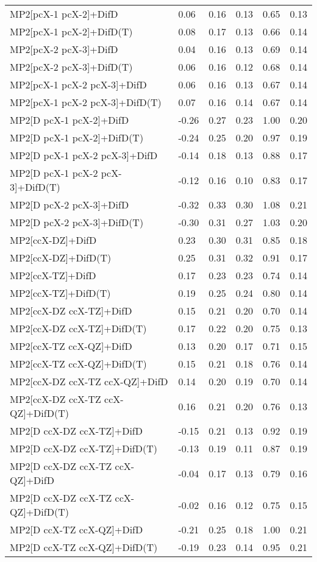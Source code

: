 \begin{table}
\begin{tabular}{l l l l l l }
    MP2[pcX-1 pcX-2]+DifD & 0.06 & 0.16 & 0.13 & 0.65 & 0.13 \\ 
    MP2[pcX-1 pcX-2]+DifD(T) & 0.08 & 0.17 & 0.13 & 0.66 & 0.14 \\ 
    MP2[pcX-2 pcX-3]+DifD & 0.04 & 0.16 & 0.13 & 0.69 & 0.14 \\ 
    MP2[pcX-2 pcX-3]+DifD(T) & 0.06 & 0.16 & 0.12 & 0.68 & 0.14 \\ 
    MP2[pcX-1 pcX-2 pcX-3]+DifD & 0.06 & 0.16 & 0.13 & 0.67 & 0.14 \\ 
    MP2[pcX-1 pcX-2 pcX-3]+DifD(T) & 0.07 & 0.16 & 0.14 & 0.67 & 0.14 \\ 
    MP2[D pcX-1 pcX-2]+DifD & -0.26 & 0.27 & 0.23 & 1.00 & 0.20 \\ 
    MP2[D pcX-1 pcX-2]+DifD(T) & -0.24 & 0.25 & 0.20 & 0.97 & 0.19 \\ 
    MP2[D pcX-1 pcX-2 pcX-3]+DifD & -0.14 & 0.18 & 0.13 & 0.88 & 0.17 \\ 
    MP2[D pcX-1 pcX-2 pcX-3]+DifD(T) & -0.12 & 0.16 & 0.10 & 0.83 & 0.17 \\ 
    MP2[D pcX-2 pcX-3]+DifD & -0.32 & 0.33 & 0.30 & 1.08 & 0.21 \\ 
    MP2[D pcX-2 pcX-3]+DifD(T) & -0.30 & 0.31 & 0.27 & 1.03 & 0.20 \\ 
    MP2[ccX-DZ]+DifD & 0.23 & 0.30 & 0.31 & 0.85 & 0.18 \\ 
    MP2[ccX-DZ]+DifD(T) & 0.25 & 0.31 & 0.32 & 0.91 & 0.17 \\ 
    MP2[ccX-TZ]+DifD & 0.17 & 0.23 & 0.23 & 0.74 & 0.14 \\ 
    MP2[ccX-TZ]+DifD(T) & 0.19 & 0.25 & 0.24 & 0.80 & 0.14 \\ 
    MP2[ccX-DZ ccX-TZ]+DifD & 0.15 & 0.21 & 0.20 & 0.70 & 0.14 \\ 
    MP2[ccX-DZ ccX-TZ]+DifD(T) & 0.17 & 0.22 & 0.20 & 0.75 & 0.13 \\ 
    MP2[ccX-TZ ccX-QZ]+DifD & 0.13 & 0.20 & 0.17 & 0.71 & 0.15 \\ 
    MP2[ccX-TZ ccX-QZ]+DifD(T) & 0.15 & 0.21 & 0.18 & 0.76 & 0.14 \\ 
    MP2[ccX-DZ ccX-TZ ccX-QZ]+DifD & 0.14 & 0.20 & 0.19 & 0.70 & 0.14 \\ 
    MP2[ccX-DZ ccX-TZ ccX-QZ]+DifD(T) & 0.16 & 0.21 & 0.20 & 0.76 & 0.13 \\ 
    MP2[D ccX-DZ ccX-TZ]+DifD & -0.15 & 0.21 & 0.13 & 0.92 & 0.19 \\ 
    MP2[D ccX-DZ ccX-TZ]+DifD(T) & -0.13 & 0.19 & 0.11 & 0.87 & 0.19 \\ 
    MP2[D ccX-DZ ccX-TZ ccX-QZ]+DifD & -0.04 & 0.17 & 0.13 & 0.79 & 0.16 \\ 
    MP2[D ccX-DZ ccX-TZ ccX-QZ]+DifD(T) & -0.02 & 0.16 & 0.12 & 0.75 & 0.15 \\ 
    MP2[D ccX-TZ ccX-QZ]+DifD & -0.21 & 0.25 & 0.18 & 1.00 & 0.21 \\ 
    MP2[D ccX-TZ ccX-QZ]+DifD(T) & -0.19 & 0.23 & 0.14 & 0.95 & 0.21 \\ 
    \bottomrule
  \end{tabular}
\end{table}
